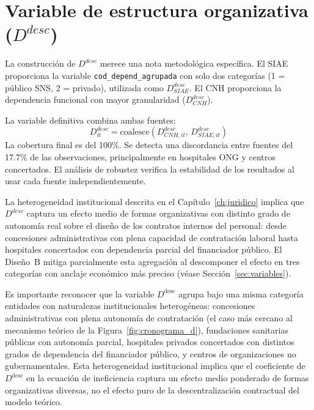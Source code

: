 \section{Variable de estructura organizativa (\texorpdfstring{$D^{desc}$}{D\^{}desc})}

La construcción de $D^{desc}$ merece una nota metodológica específica. El SIAE proporciona la variable \texttt{cod\_depend\_agrupada} con solo dos categorías (1 = público SNS, 2 = privado), utilizada como $D^{desc}_{SIAE}$. El CNH proporciona la dependencia funcional con mayor granularidad ($D^{desc}_{CNH}$).

La variable definitiva combina ambas fuentes:
\begin{equation}
  D^{desc}_{it} = \text{coalesce}(D^{desc}_{CNH,it},\, D^{desc}_{SIAE,it})
\end{equation}
La cobertura final es del 100\%. Se detecta una discordancia entre fuentes del 17.7\% de las observaciones, principalmente en hospitales ONG y centros concertados. El análisis de robustez verifica la estabilidad de los resultados al usar cada fuente independientemente.

La heterogeneidad institucional descrita en el Capítulo~\ref{ch:juridico} implica que $D^{desc}$ captura un efecto medio de formas organizativas con distinto grado de autonomía real sobre el diseño de los contratos internos del personal: desde concesiones administrativas con plena capacidad de contratación laboral hasta hospitales concertados con dependencia parcial del financiador público. El Diseño~B mitiga parcialmente esta agregación al descomponer el efecto en tres categorías con anclaje económico más preciso (véase Sección~\ref{sec:variables}).

Es importante reconocer que la variable $D^{\text{desc}}$ agrupa bajo una misma categoría entidades con naturalezas institucionales heterogéneas: concesiones administrativas con plena autonomía de contratación (el caso más cercano al mecanismo teórico de la Figura~\ref{fig:cronograma_d}), fundaciones sanitarias públicas con autonomía parcial, hospitales privados concertados con distintos grados de dependencia del financiador público, y centros de organizaciones no gubernamentales. Esta heterogeneidad institucional implica que el coeficiente de $D^{\text{desc}}$ en la ecuación de ineficiencia captura un efecto medio ponderado de formas organizativas diversas, no el efecto puro de la descentralización contractual del modelo teórico.


